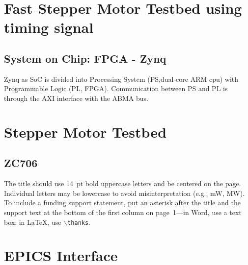 \documentclass[a4paper,
              ]{jacow}
\begin{document}
\section{Fast Stepper Motor Testbed using timing signal}

\subsection{System on Chip: FPGA - Zynq}
Zynq\cite{xilix}\cite{zynq} as SoC is divided into Processing System (PS,dual-core ARM cpu) with  Programmable Logic (PL, FPGA). Communication between PS and PL is through the AXI interface with the ABMA bus.

\section{Stepper Motor Testbed}
\subsection{ZC706}
The title should use \SI{14}{pt} bold uppercase letters and be centered on the page.
Individual letters may be lowercase to avoid misinterpretation (e.g., mW, MW).
To include a funding support statement, put an asterisk after the title and
the support text at the bottom of the first column on page~1---in Word,
use a text box; in \LaTeX, use $\backslash$\texttt{thanks}.

\section{EPICS Interface}
\end{document}

